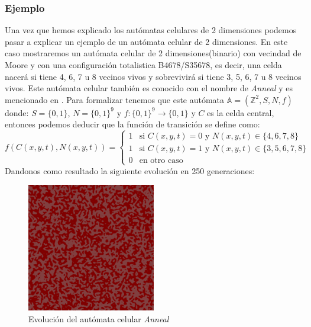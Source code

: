 \subsubsection{Ejemplo}
    Una vez que hemos explicado los aut\'omatas celulares de 2 dimensiones podemos pasar a explicar un ejemplo de un aut\'omata celular de 2 dimensiones.
    \vskip 0.5cm
    En este caso mostraremos un aut\'omata celular de 2 dimensiones(binario) con vecindad de Moore y con una configuraci\'on totalistica 
        B4678/S35678, es decir, una celda nacer\'a si tiene 4, 6, 7 u 8 vecinos vivos y sobrevivir\'a si tiene 3, 5, 6, 7 u 8 vecinos vivos.
        Este aut\'omata celular tambi\'en es conocido con el nombre de \textit{Anneal} y es mencionado en \cite{Bastien2010}.
    \vskip 0.5cm
    Para formalizar tenemos que este aut\'omata $\mathbb{A} = (\mathbb{Z}^2, S, N, f)$ donde: 
        $S = \{0,1\}$, $N = \{0,1\}^9$ y $f: \{0,1\}^9 \rightarrow \{0,1\}$ y $C$ es la celda central, 
        entonces podemos deducir que la funci\'on de transici\'on se define como:
        \begin{equation*}
            f(C(x,y,t),N(x,y,t)) = \begin{cases}
                1 & \text{si } C(x,y,t) = 0 \text{ y } N(x,y,t) \in \{4,6,7,8\} \\
                1 & \text{si } C(x,y,t) = 1 \text{ y } N(x,y,t) \in \{3,5,6,7,8\} \\
                0 & \text{en otro caso}
            \end{cases}
        \end{equation*}
    \vskip 0.5cm
    Dandonos como resultado la siguiente evoluci\'on en 250 generaciones:
    \begin{figure}[h]
        \centering
        \includegraphics[width=0.5\textwidth]{./images/marco_teorico/automatas_celulares/Anneal.png}
        \caption{Evoluci\'on del aut\'omata celular \textit{Anneal}}
        \label{fig:anneal}
    \end{figure}
    \clearpage
